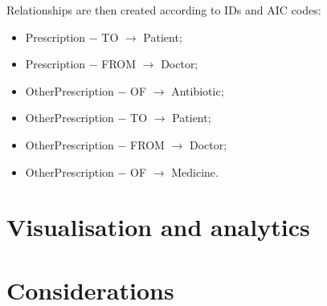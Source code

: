 Relationships are then created according to IDs and AIC codes:
\begin{itemize}
	\item Prescription $-$ TO $\rightarrow$ Patient;
	\item Prescription $-$ FROM $\rightarrow$ Doctor;
	\item OtherPrescription $-$ OF $\rightarrow$ Antibiotic;
	\item OtherPrescription $-$ TO $\rightarrow$ Patient;
	\item OtherPrescription $-$ FROM $\rightarrow$ Doctor;
	\item OtherPrescription $-$ OF $\rightarrow$ Medicine.
\end{itemize}


\section{Visualisation and analytics}

\section{Considerations}







